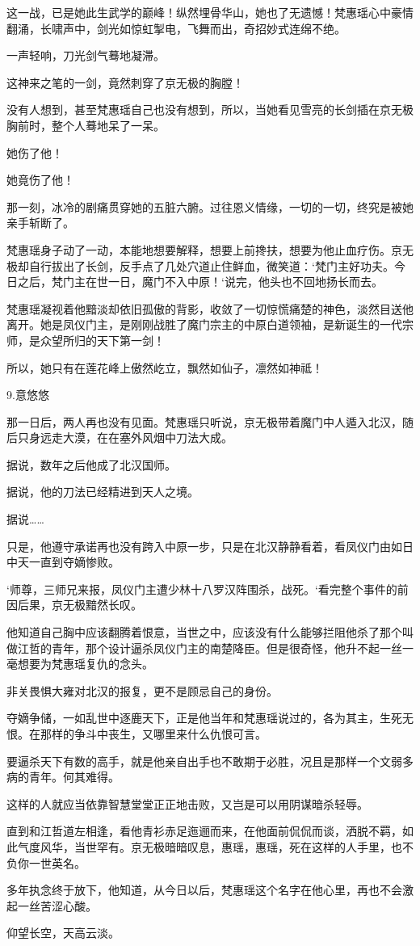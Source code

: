 这一战，已是她此生武学的巅峰！纵然埋骨华山，她也了无遗憾！梵惠瑶心中豪情翻涌，长啸声中，剑光如惊虹掣电，飞舞而出，奇招妙式连绵不绝。

一声轻响，刀光剑气蓦地凝滞。

这神来之笔的一剑，竟然刺穿了京无极的胸膛！

没有人想到，甚至梵惠瑶自己也没有想到，所以，当她看见雪亮的长剑插在京无极胸前时，整个人蓦地呆了一呆。

她伤了他！

她竟伤了他！

那一刻，冰冷的剧痛贯穿她的五脏六腑。过往恩义情缘，一切的一切，终究是被她亲手斩断了。

梵惠瑶身子动了一动，本能地想要解释，想要上前搀扶，想要为他止血疗伤。京无极却自行拔出了长剑，反手点了几处穴道止住鲜血，微笑道：‘梵门主好功夫。今日之后，梵门主在世一日，魔门不入中原！‘说完，他头也不回地扬长而去。

梵惠瑶凝视着他黯淡却依旧孤傲的背影，收敛了一切惊慌痛楚的神色，淡然目送他离开。她是凤仪门主，是刚刚战胜了魔门宗主的中原白道领袖，是新诞生的一代宗师，是众望所归的天下第一剑！

所以，她只有在莲花峰上傲然屹立，飘然如仙子，凛然如神祗！

9.意悠悠

那一日后，两人再也没有见面。梵惠瑶只听说，京无极带着魔门中人遁入北汉，随后只身远走大漠，在在塞外风烟中刀法大成。

据说，数年之后他成了北汉国师。

据说，他的刀法已经精进到天人之境。

据说……

只是，他遵守承诺再也没有跨入中原一步，只是在北汉静静看着，看凤仪门由如日中天一直到夺嫡惨败。

‘师尊，三师兄来报，凤仪门主遭少林十八罗汉阵围杀，战死。‘看完整个事件的前因后果，京无极黯然长叹。

他知道自己胸中应该翻腾着恨意，当世之中，应该没有什么能够拦阻他杀了那个叫做江哲的青年，那个设计逼杀凤仪门主的南楚降臣。但是很奇怪，他升不起一丝一毫想要为梵惠瑶复仇的念头。

非关畏惧大雍对北汉的报复，更不是顾忌自己的身份。

夺嫡争储，一如乱世中逐鹿天下，正是他当年和梵惠瑶说过的，各为其主，生死无恨。在那样的争斗中丧生，又哪里来什么仇恨可言。

要逼杀天下有数的高手，就是他亲自出手也不敢期于必胜，况且是那样一个文弱多病的青年。何其难得。

这样的人就应当依靠智慧堂堂正正地击败，又岂是可以用阴谋暗杀轻辱。

直到和江哲道左相逢，看他青衫赤足迤逦而来，在他面前侃侃而谈，洒脱不羁，如此气度风华，当世罕有。京无极暗暗叹息，惠瑶，惠瑶，死在这样的人手里，也不负你一世英名。

多年执念终于放下，他知道，从今日以后，梵惠瑶这个名字在他心里，再也不会激起一丝苦涩心酸。

仰望长空，天高云淡。
